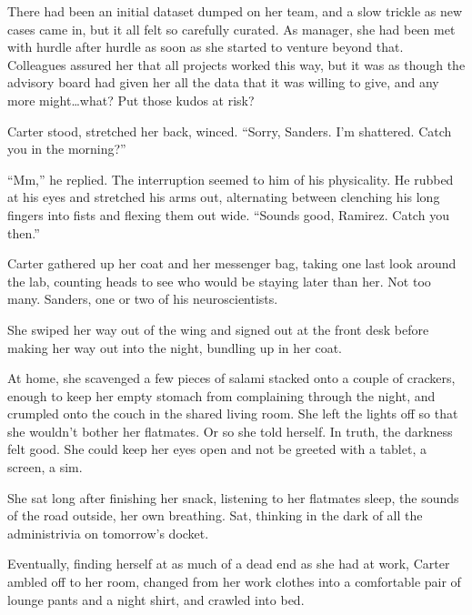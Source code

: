 There had been an initial dataset dumped on her team, and a slow trickle as new cases came in, but it all felt so carefully curated. As manager, she had been met with hurdle after hurdle as soon as she started to venture beyond that. Colleagues assured her that all projects worked this way, but it was as though the advisory board had given her all the data that it was willing to give, and any more might\ldots{}what? Put those kudos at risk?

Carter stood, stretched her back, winced. ``Sorry, Sanders. I'm shattered. Catch you in the morning?''

``Mm,'' he replied. The interruption seemed to him of his physicality. He rubbed at his eyes and stretched his arms out, alternating between clenching his long fingers into fists and flexing them out wide. ``Sounds good, Ramirez. Catch you then.''

Carter gathered up her coat and her messenger bag, taking one last look around the lab, counting heads to see who would be staying later than her. Not too many. Sanders, one or two of his neuroscientists.

She swiped her way out of the wing and signed out at the front desk before making her way out into the night, bundling up in her coat.

At home, she scavenged a few pieces of salami stacked onto a couple of crackers, enough to keep her empty stomach from complaining through the night, and crumpled onto the couch in the shared living room. She left the lights off so that she wouldn't bother her flatmates. Or so she told herself. In truth, the darkness felt good. She could keep her eyes open and not be greeted with a tablet, a screen, a sim.

She sat long after finishing her snack, listening to her flatmates sleep, the sounds of the road outside, her own breathing. Sat, thinking in the dark of all the administrivia on tomorrow's docket.

Eventually, finding herself at as much of a dead end as she had at work, Carter ambled off to her room, changed from her work clothes into a comfortable pair of lounge pants and a night shirt, and crawled into bed.
